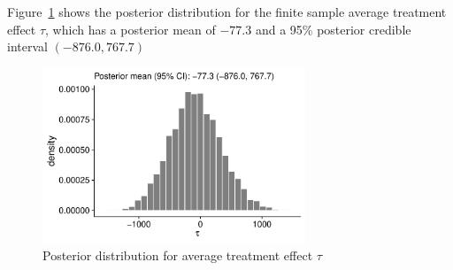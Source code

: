 \begin{enumerate}[(a)]
  Figure~\ref{fig:tauplot} shows the posterior distribution for the
  finite sample average treatment effect $\tau$, which has a posterior
  mean of $-77.3$ and a 95\% posterior credible interval $(-876.0, 767.7)$
  
  \begin{figure}[ht]
    \centering
    \includegraphics[width=0.7\textwidth]{figures/tauplot.pdf}
    \caption{\label{fig:tauplot} Posterior distribution for average
      treatment effect $\tau$ }
  \end{figure}


\end{enumerate}

